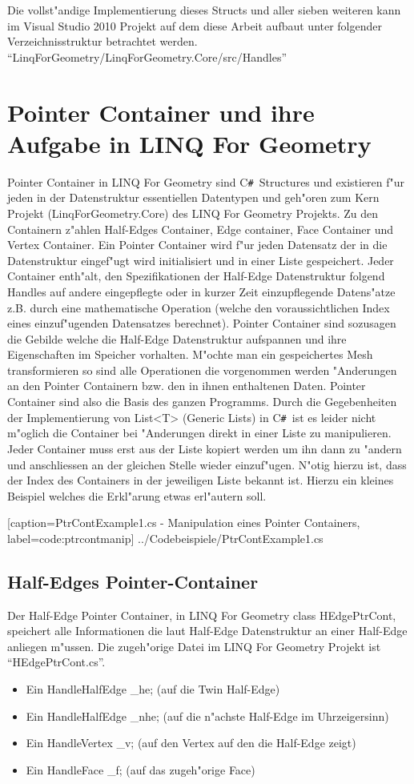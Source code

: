 \documentclass[pagesize, paper=a4, fontsize=12pt,titlepage=true, headings=small, headnosepline, abstractoff, liststotoc, nochapterprefix, plainheadsepline]{scrreprt}
\newcommand{\CSS}{C\texttt{\# }}
\newcommand{\LFG}{LINQ For Geometry}
\newcommand{\LFGS}{LINQ For Geometry }
\newcommand{\HES}{Half-Edge Datenstruktur }
\begin{document}
Die vollst"andige Implementierung dieses Structs und aller sieben weiteren kann im Visual Studio 2010 Projekt auf dem diese Arbeit aufbaut unter folgender Verzeichnisstruktur betrachtet werden. "`LinqForGeometry/LinqForGeometry.Core/src/Handles"'

\section {Pointer Container und ihre Aufgabe in \LFG}
		Pointer Container in \LFGS sind \CSS Structures und existieren f"ur jeden in der Datenstruktur essentiellen Datentypen und geh"oren zum Kern Projekt (LinqForGeometry.Core) des \LFGS Projekts. Zu den Containern z"ahlen Half-Edges Container, Edge container, Face Container und Vertex Container. Ein Pointer Container wird f"ur jeden Datensatz der in die Datenstruktur eingef"ugt wird initialisiert und in einer Liste gespeichert. Jeder Container enth"alt, den Spezifikationen der \HES folgend Handles auf andere eingepflegte oder in kurzer Zeit einzupflegende Datens"atze z.B. durch eine mathematische Operation (welche den voraussichtlichen Index eines einzuf"ugenden Datensatzes berechnet). Pointer Container sind sozusagen die Gebilde welche die Half-Edge Datenstruktur aufspannen und ihre Eigenschaften im Speicher vorhalten. M"ochte man ein gespeichertes Mesh transformieren so sind alle Operationen die vorgenommen werden "Anderungen an den Pointer Containern bzw. den in ihnen enthaltenen Daten. Pointer Container sind also die Basis des ganzen Programms. Durch die Gegebenheiten der Implementierung von List<T> (Generic Lists) in \CSS ist es leider nicht m"oglich die Container bei "Anderungen direkt in einer Liste zu manipulieren. Jeder Container muss erst aus der Liste kopiert werden um ihn dann zu "andern und anschliessen an der gleichen Stelle wieder einzuf"ugen. N"otig hierzu ist, dass der Index des Containers in der jeweiligen Liste bekannt ist. Hierzu ein kleines Beispiel welches die Erkl"arung etwas erl"autern soll.

			[caption={PtrContExample1.cs - Manipulation eines Pointer Containers}, label=code:ptrcontmanip]
			{../Codebeispiele/PtrContExample1.cs}
\subsection {Half-Edges Pointer-Container}
			Der Half-Edge Pointer Container, in \LFGS class HEdgePtrCont, speichert alle Informationen die laut \HES an einer Half-Edge anliegen m"ussen. Die zugeh"orige Datei im \LFGS Projekt ist "`HEdgePtrCont.cs"'.
\begin{itemize}
\item Ein HandleHalfEdge \_he; (auf die Twin Half-Edge)
\item Ein HandleHalfEdge \_nhe; (auf die n"achste Half-Edge im Uhrzeigersinn)
\item Ein HandleVertex \_v; (auf den Vertex auf den die Half-Edge zeigt)
\item Ein HandleFace \_f; (auf das zugeh"orige Face)
\end{itemize}
\end{document}

